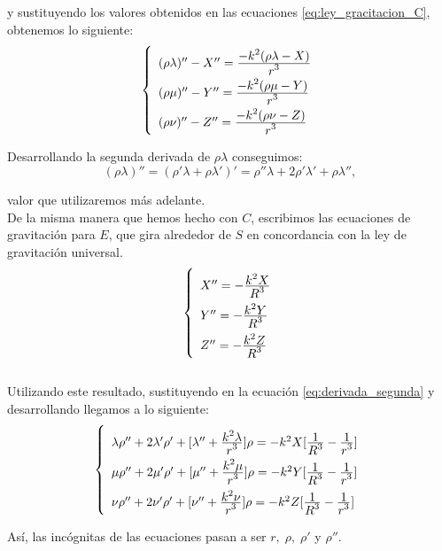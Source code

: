 \documentclass[11pt]{article}
\newcommand\ddfrac[2]{\frac{\displaystyle #1}{\displaystyle #2}}
\begin{document}
\noindent y sustituyendo los valores obtenidos en las  ecuaciones \eqref{eq:ley_gracitacion_C}, obtenemos lo siguiente:
\begin{align}
\left\{
\def\arraystretch{2}
\begin{array}{l}
	(\rho\lambda)'' - X'' = \ddfrac{-k^2(\rho\lambda-X)}{r^3}\\
	(\rho\mu)'' - Y'' = \ddfrac{-k^2(\rho\mu-Y)}{r^3}\\
	(\rho\nu)'' - Z'' = \ddfrac{-k^2(\rho\nu-Z)}{r^3}
\end{array}
\right.
\label{eq:derivada_segunda}
\end{align}

Desarrollando la segunda derivada de $\rho\lambda$ conseguimos:
\[
(\rho\lambda)''=(\rho'\lambda+\rho\lambda')'=\rho''\lambda+2\rho'\lambda'+\rho\lambda'',
\]

\noindent valor que utilizaremos más adelante.\\

De la misma manera que hemos hecho con $C$, escribimos las ecuaciones de gravitación para $E$, que gira alrededor de $S$ en concordancia con la ley de gravitación universal.
\begin{align}
\left\{
\def\arraystretch{2}
\begin{array}{l}
	X'' = -\ddfrac{k^2X}{R^3}\\
	Y'' = -\ddfrac{k^2Y}{R^3}\\
	Z'' = -\ddfrac{k^2Z}{R^3}
\end{array}
\right.
\label{eq:ley_gravitacion_E}
\end{align}\\

Utilizando este resultado, sustituyendo en la ecuación \eqref{eq:derivada_segunda} y desarrollando llegamos a lo siguiente:
\begin{align}
\left\{
\def\arraystretch{2}
\begin{array}{l}
	\lambda\rho''+2\lambda'\rho'+[\lambda''+\ddfrac{k^2\lambda}{r^3}]\rho=-k^2X[\ddfrac{1}{R^3}-\ddfrac{1}{r^3}]\\
	\mu\rho''+2\mu'\rho'+[\mu''+\ddfrac{k^2\mu}{r^3}]\rho=-k^2Y[\ddfrac{1}{R^3}-\ddfrac{1}{r^3}]\\
	\nu\rho''+2\nu'\rho'+[\nu''+\ddfrac{k^2\nu}{r^3}]\rho=-k^2Z[\ddfrac{1}{R^3}-\ddfrac{1}{r^3}]
\end{array}
\right.
\label{eq:fundamental_equations}
\end{align}

Así, las incógnitas de las ecuaciones pasan a ser $r, \; \rho, \; \rho'$ y $\rho''$.\\
\end{document}
